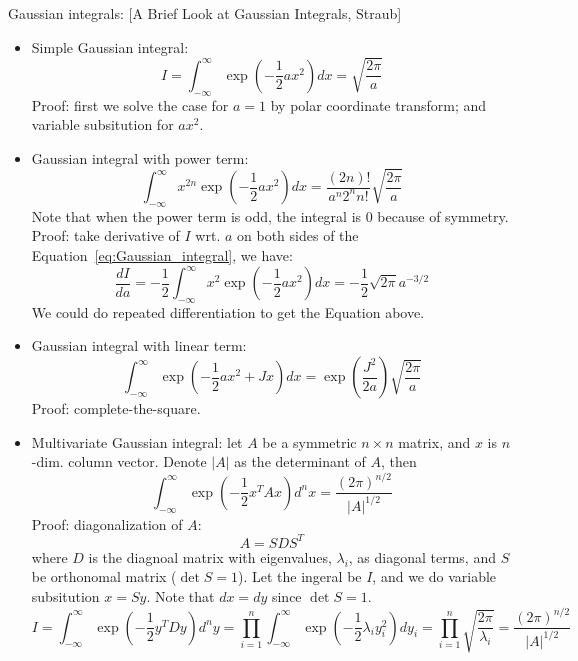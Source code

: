 \documentclass{report}
\begin{document}
Gaussian integrals: [A Brief Look at Gaussian Integrals, Straub]
\begin{itemize}
	\item Simple Gaussian integral: 
	\begin{equation}
	I = \int_{-\infty}^{\infty} \exp(-\frac{1}{2}a x^2) dx = \sqrt{\frac{2\pi}{a}}	
	\label{eq:Gaussian_integral}
	\end{equation}
	Proof: first we solve the case for $a = 1$ by polar coordinate transform; and variable subsitution for $a x^2$. 
	
	\item Gaussian integral with power term: 
	\begin{equation}
	\int_{-\infty}^{\infty} x^{2n} \exp(-\frac{1}{2}a x^2) dx = \frac{(2n)!}{a^n 2^n n!} \sqrt{\frac{2\pi}{a}}		
	\end{equation}
	Note that when the power term is odd, the integral is 0 because of symmetry. \\
	Proof: take derivative of $I$ wrt. $a$ on both sides of the Equation~\ref{eq:Gaussian_integral}, we have: 
	\begin{equation}
	\frac{dI}{da} = -\frac{1}{2} \int_{-\infty}^{\infty} x^{2} \exp(-\frac{1}{2}a x^2) dx = -\frac{1}{2} \sqrt{2\pi} a^{-3/2}
	\end{equation}
	We could do repeated differentiation to get the Equation above. 
	
	\item Gaussian integral with linear term: 
	\begin{equation}
	\int_{-\infty}^{\infty} \exp(-\frac{1}{2}a x^2 + Jx) dx = \exp\left(\frac{J^2}{2a}\right) \sqrt{\frac{2\pi}{a}}		
	\end{equation}
	Proof: complete-the-square. 
	
	\item Multivariate Gaussian integral: let $A$ be a symmetric $n \times n$ matrix, and $x$ is $n$-dim. column vector. Denote $|A|$ as the determinant of $A$, then
	\begin{equation}
	\int_{-\infty}^{\infty} \exp(-\frac{1}{2}x^T A x) d^n x = \frac{(2 \pi)^{n/2}}{|A|^{1/2}}	
	\end{equation}
	Proof: diagonalization of $A$: 
	\begin{equation}
	A = S D S^T	
	\end{equation}
	where $D$ is the diagnoal matrix with eigenvalues, $\lambda_i$, as diagonal terms, and $S$ be orthonomal matrix ($\det S = 1$). Let the ingeral be $I$, and we do variable subsitution $x = Sy$. Note that $dx = dy$ since $\det S = 1$. 
	\begin{equation}
	I = \int_{-\infty}^{\infty}	 \exp(-\frac{1}{2}y^T D y) d^n y = \prod_{i=1}^n \int_{-\infty}^{\infty} \exp(-\frac{1}{2} \lambda_i y_i^2) dy_i = \prod_{i=1}^n \sqrt{\frac{2 \pi}{\lambda_i}} = \frac{(2 \pi)^{n/2}}{|A|^{1/2}}
	\end{equation}
	

\end{itemize}
\end{document}
